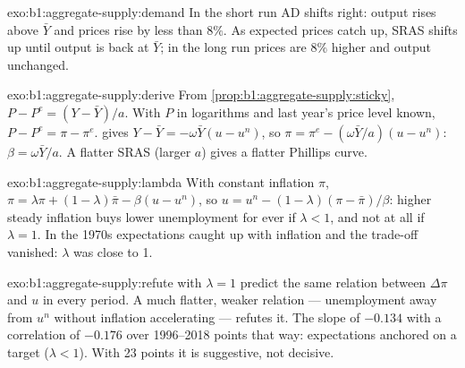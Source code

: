 \begin{solution}{exo:b1:aggregate-supply:demand}
In the short run AD shifts right: output rises above $\bar Y$ and prices rise by
less than $8\%$. As expected prices catch up, SRAS shifts up until output is
back at $\bar Y$; in the long run prices are $8\%$ higher and output unchanged.
\end{solution}

\begin{solution}{exo:b1:aggregate-supply:derive}
From \cref{prop:b1:aggregate-supply:sticky}, $P - P^e = (Y - \bar Y)/a$. With $P$ in logarithms
and last year's price level known, $P - P^e = \pi - \pi^e$.  gives
$Y - \bar Y = -\omega\bar Y(u - u^n)$, so $\pi = \pi^e - (\omega\bar Y/a)(u - u^n)$: $\beta = \omega\bar Y/a$. A flatter SRAS
(larger $a$) gives a flatter Phillips curve.
\end{solution}

\begin{solution}{exo:b1:aggregate-supply:lambda}
With constant inflation $\pi$, $\pi = \lambda\pi + (1 - \lambda)\bar\pi - \beta(u - u^n)$, so
$u = u^n - (1 - \lambda)(\pi - \bar\pi)/\beta$: higher steady inflation buys lower unemployment
for ever if $\lambda < 1$, and not at all if $\lambda = 1$. In the 1970s expectations caught up
with inflation and the trade-off vanished: $\lambda$ was close to 1.
\end{solution}

\begin{solution}{exo:b1:aggregate-supply:refute}
 with $\lambda = 1$ predict the same relation between $\Delta\pi$ and $u$
in every period. A much flatter, weaker relation --- unemployment away from
$u^n$ without inflation accelerating --- refutes it. The slope of $-0.134$ with a
correlation of $-0.176$ over 1996--2018 points that way: expectations
anchored on a target ($\lambda < 1$). With 23 points it is suggestive, not decisive.
\end{solution}

